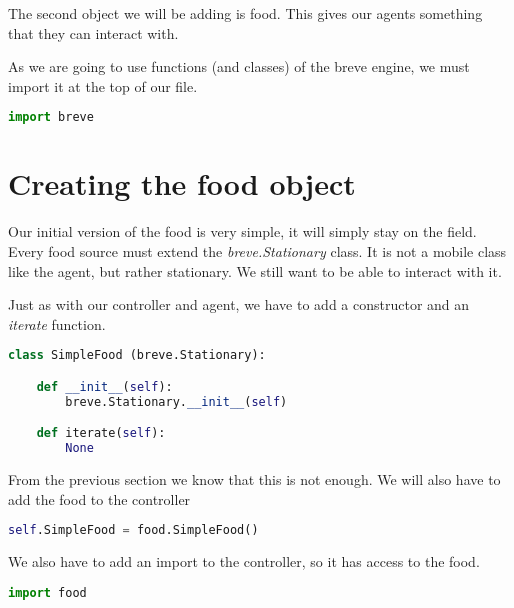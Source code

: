 The second object we will be adding is food. This gives our agents something that they can interact with.


As we are going to use functions (and classes) of the breve engine, we must import it at the top of our file.

\begin{lstlisting}[language=Python]
import breve
\end{lstlisting}


\section{Creating the food object}

Our initial version of the food is very simple, it will simply stay on the field. Every food source must extend the \textit{breve.Stationary} class. It is not a mobile class like the agent, but rather stationary. We still want to be able to interact with it.

Just as with our controller and agent, we have to add a constructor and an \textit{iterate} function.

\begin{lstlisting}[language=Python]
class SimpleFood (breve.Stationary):

    def __init__(self):
        breve.Stationary.__init__(self)

    def iterate(self):
        None
\end{lstlisting}


From the previous section we know that this is not enough. We will also have to add the food to the controller

\begin{lstlisting}[language=Python]
self.SimpleFood = food.SimpleFood()
\end{lstlisting}


We also have to add an import to the controller, so it has access to the food.

\begin{lstlisting}[language=Python]
import food
\end{lstlisting}

